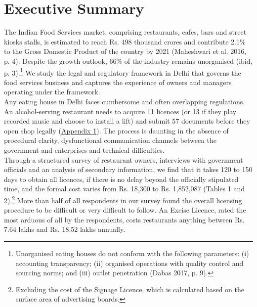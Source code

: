 \documentclass[a4paper, 12pt]{article}
\begin{document}
         
 
                        
                    \newpage
                    \section*{Executive Summary}
               
                  
                   The Indian Food Services market, comprising restaurants, cafes, bars and street kiosks stalls, is estimated to reach Rs. 498 thousand crores and contribute 2.1\% to the Gross Domestic Product of the country by 2021 (Maheshwari et al. 2016, p. 4). Despite the growth outlook, 66\% of the industry remains unorganised (ibid, p. 3).\footnote{Unorganised eating houses do not conform with the following parameters: (i) accounting transparency; (ii) organised operations with quality control and sourcing norms; and (iii) outlet penetration (Dabas 2017, p. 9).}  We study the legal and regulatory framework in Delhi that governs the food services business and captures the experience of owners and managers operating under the framework. \\
          Any eating house in Delhi faces cumbersome and often overlapping regulations. An alcohol-serving restaurant needs to acquire 11 licences (or 13 if they play recorded music and choose to install a lift) and submit 57 documents before they open shop legally (\hyperref[Appendix 1]{Appendix 1}). The process is daunting in the absence of procedural clarity, dysfunctional communication channels between the government and enterprises and technical difficulties. \\           
                    Through a structured survey of restaurant owners, interviews with government officials and an analysis of secondary information, we find that it takes 120 to 150 days to obtain all licences, if there is no delay beyond the officially stipulated time, and the formal cost varies from Rs. 18,300 to Rs. 1,852,087 (Tables 1 and 2).\footnote{Excluding the cost of the Signage Licence, which is calculated based on the surface area of advertising boards.} More than half of all respondents in our survey found the overall licensing procedure to be difficult or very difficult to follow. An Excise Licence, rated the most arduous of all by the respondents, costs restaurants anything between Rs. 7.64 lakhs and Rs. 18.52 lakhs annually. \\ %
\end{document}
